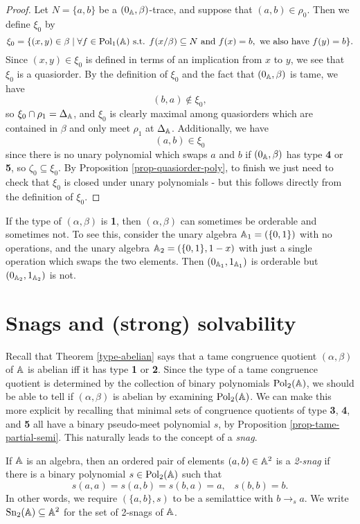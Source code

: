 \begin{appendices}
\begin{proof}
Let $N = \{a,b\}$ be a $(0_{\mathbb{A}},\beta)$-trace, and suppose that $(a,b) \in \rho_0$. Then we define $\xi_0$ by
\[
\xi_0 = \{(x,y) \in \beta \mid \forall f \in \operatorname{Pol}_1(\mathbb{A}) \text{ s.t. } f(x/\beta) \subseteq N \text{ and } f(x) = b, \text{ we also have } f(y) = b\}.
\]
Since $(x,y) \in \xi_0$ is defined in terms of an implication from $x$ to $y$, we see that $\xi_0$ is a quasiorder. By the definition of $\xi_0$ and the fact that $(0_{\mathbb{A}},\beta)$ is tame, we have
\[
(b,a) \not\in \xi_0,
\]
so $\xi_0 \cap \rho_1 = \Delta_{\mathbb{A}}$, and $\xi_0$ is clearly maximal among quasiorders which are contained in $\beta$ and only meet $\rho_1$ at $\Delta_{\mathbb{A}}$. Additionally, we have
\[
(a,b) \in \xi_0
\]
since there is no unary polynomial which swaps $a$ and $b$ if $(0_{\mathbb{A}},\beta)$ has type \textbf{4} or \textbf{5}, so $\zeta_0 \subseteq \xi_0$. By Proposition \ref{prop-quasiorder-poly}, to finish we just need to check that $\xi_0$ is closed under unary polynomials - but this follows directly from the definition of $\xi_0$.
\end{proof}

\begin{ex} If the type of $(\alpha,\beta)$ is \textbf{1}, then $(\alpha,\beta)$ can sometimes be orderable and sometimes not. To see this, consider the unary algebra $\mathbb{A}_1 = (\{0,1\})$ with no operations, and the unary algebra $\mathbb{A}_2 = (\{0,1\}, 1-x)$ with just a single operation which swaps the two elements. Then $(0_{\mathbb{A}_1},1_{\mathbb{A}_1})$ is orderable but $(0_{\mathbb{A}_2}, 1_{\mathbb{A}_2})$ is not.
\end{ex}


\section{Snags and (strong) solvability}\label{a-sec-snags}

Recall that Theorem \ref{type-abelian} says that a tame congruence quotient $(\alpha,\beta)$ of $\mathbb{A}$ is abelian iff it has type \textbf{1} or \textbf{2}. Since the type of a tame congruence quotient is determined by the collection of binary polynomials $\operatorname{Pol}_2(\mathbb{A})$, we should be able to tell if $(\alpha,\beta)$ is abelian by examining $\operatorname{Pol}_2(\mathbb{A})$. We can make this more explicit by recalling that minimal sets of congruence quotients of type \textbf{3}, \textbf{4}, and \textbf{5} all have a binary pseudo-meet polynomial $s$, by Proposition \ref{prop-tame-partial-semi}. This naturally leads to the concept of a \emph{snag}.

\begin{defn} If $\mathbb{A}$ is an algebra, then an ordered pair of elements $(a,b) \in \mathbb{A}^2$ is a \emph{2-snag} if there is a binary polynomial $s \in \operatorname{Pol}_2(\mathbb{A})$ such that
\[
s(a,a) = s(a,b) = s(b,a) = a, \;\;\; s(b,b) = b.
\]
In other words, we require $(\{a,b\},s)$ to be a semilattice with $b \rightarrow_s a$. We write $\operatorname{Sn}_2(\mathbb{A}) \subseteq \mathbb{A}^2$ for the set of 2-snags of $\mathbb{A}$.
\end{defn}


\end{appendices}
